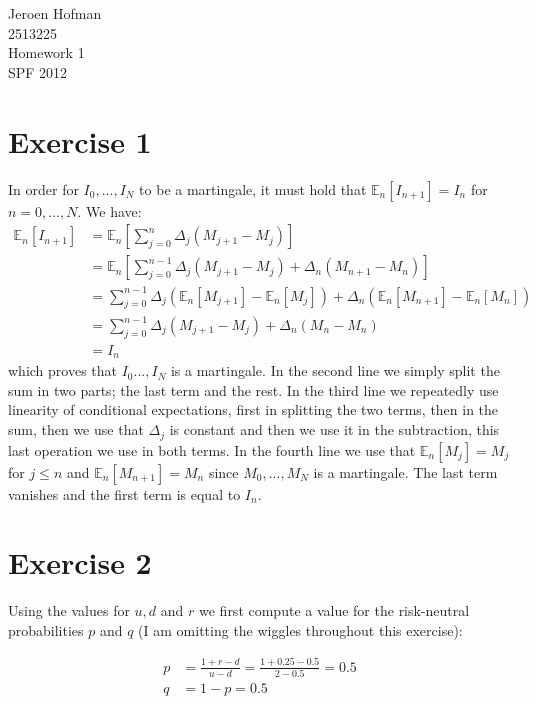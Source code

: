 \documentclass[11pt,a4paper,onecolumn]{article}
\begin{document}
\captionsetup{width=0.8\textwidth}
\thispagestyle{empty}

{\Huge Jeroen Hofman \\}
{\Large 2513225 \\
Homework 1 \\
SPF 2012}

\section{Exercise 1}
In order for $I_0,...,I_N$ to be a martingale, it must hold that $\mathbb{E}_n[I_{n+1}] = I_n$ for $n = 0,...,N$. We have: 
\begin{align}
  \mathbb{E}_n[I_{n+1}] &= \mathbb{E}_n\left[\sum^n_{j=0} \Delta_j (M_{j+1} - M_j)\right] \\
  &= \mathbb{E}_n\left[\sum^{n-1}_{j=0} \Delta_j (M_{j+1} - M_j) + \Delta_n(M_{n+1} - M_n)\right] \\
  &= \sum^{n-1}_{j=0} \Delta_j (\mathbb{E}_n[M_{j+1}] - \mathbb{E}_n[M_j]) +\Delta_n (\mathbb{E}_n[M_{n+1}] - \mathbb{E}_n[M_n])\\
  &= \sum^{n-1}_{j=0} \Delta_j (M_{j+1} - M_j) + \Delta_n (M_n - M_n) \\
  &= I_n
\end{align}
which proves that $I_0...,I_N$ is a martingale. In the second line we simply split the sum in two parts; the last term and the rest. In the third line we repeatedly use linearity of conditional expectations, first in splitting the two terms, then in the sum, then we use that $\Delta_j$ is constant and then we use it in the subtraction, this last operation we use in both terms. In the fourth line we use that $\mathbb{E}_n[M_j] = M_j$ for $j \leq n$ and $\mathbb{E}_n[M_{n+1}] = M_n$ since $M_0,...,M_N$ is a martingale. The last term vanishes and the first term is equal to $I_n$.

\section{Exercise 2}
Using the values for $u,d$ and $r$ we first compute a value for the risk-neutral probabilities $p$ and $q$ (I am omitting the wiggles throughout this exercise):

\begin{align}
  p &= \frac{1 + r - d}{u - d} = \frac{1 + 0.25 - 0.5}{2 - 0.5} = 0.5 \\
  q &= 1 - p = 0.5
\end{align}
\end{document}
